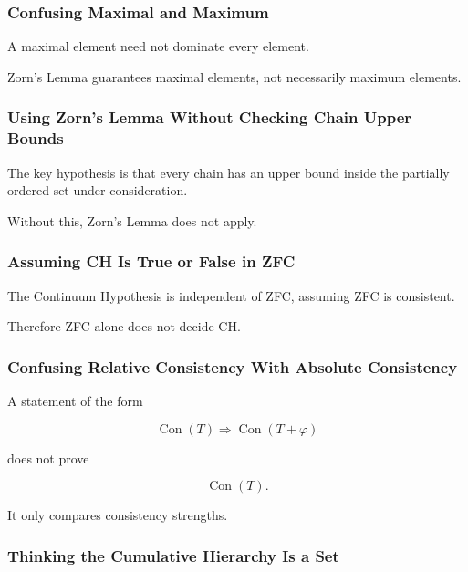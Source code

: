 \subsubsection{Confusing Maximal and Maximum}

A maximal element need not dominate every element.

Zorn's Lemma guarantees maximal elements, not necessarily maximum elements.

\subsubsection{Using Zorn's Lemma Without Checking Chain Upper Bounds}

The key hypothesis is that every chain has an upper bound inside the
partially ordered set under consideration.

Without this, Zorn's Lemma does not apply.

\subsubsection{Assuming CH Is True or False in ZFC}

The Continuum Hypothesis is independent of ZFC, assuming ZFC is consistent.

Therefore ZFC alone does not decide CH.

\subsubsection{Confusing Relative Consistency With Absolute Consistency}

A statement of the form

\[
\operatorname{Con}(T)
\Longrightarrow
\operatorname{Con}(T+\varphi)
\]

does not prove

\[
\operatorname{Con}(T).
\]

It only compares consistency strengths.

\subsubsection{Thinking the Cumulative Hierarchy Is a Set}

